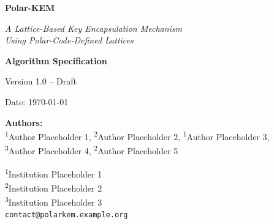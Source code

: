 \documentclass[11pt,a4paper]{article}
\begin{document}
\begin{titlepage}
\centering
\vspace*{2cm}

{\Huge\bfseries Polar-KEM\par}
\vspace{0.5cm}
{\LARGE\itshape A Lattice-Based Key Encapsulation Mechanism\\Using Polar-Code-Defined Lattices\par}

\vspace{2cm}

{\Large\bfseries Algorithm Specification\par}
\vspace{0.3cm}
{\large Version 1.0 -- Draft\par}

\vspace{1.5cm}

{\large Date: \today\par}

\vspace{3cm}

{\large
\textbf{Authors:}\\[0.5em]
\textsuperscript{1}Author Placeholder 1,
\textsuperscript{2}Author Placeholder 2,
\textsuperscript{1}Author Placeholder 3,\\
\textsuperscript{3}Author Placeholder 4,
\textsuperscript{2}Author Placeholder 5
\par}

\vspace{1cm}

{\normalsize
\textsuperscript{1}Institution Placeholder 1\\
\textsuperscript{2}Institution Placeholder 2\\
\textsuperscript{3}Institution Placeholder 3\\
\texttt{contact@polarkem.example.org}
\par}

\vfill


\end{titlepage}
\end{document}
